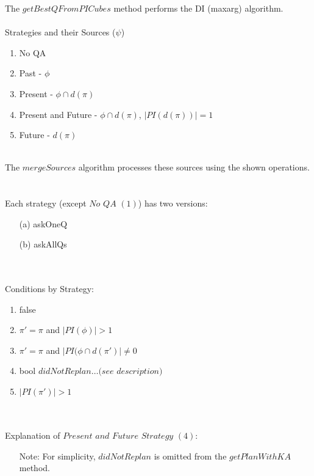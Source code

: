 \documentclass[letterpaper]{article}
\begin{document}
The $getBestQFromPICubes$ method performs the DI (maxarg) algorithm. 
\ \\
\ \\
\noindent Strategies and their Sources ($\psi$)
\begin{enumerate}
  \item No QA
  \item Past               - $\phi$
  \item Present            - $\phi \cap d(\pi)$
  \item Present and Future - $\phi \cap d(\pi)$, $|PI(d(\pi))| = 1$
  \item Future             - $d(\pi)$
\end{enumerate}
\ \\
The $mergeSources$ algorithm processes these sources using the shown operations.
\ \\
\ \\
\noindent Each strategy (except $No$  $QA$ $(1)$) has two versions:
\begin{enumerate}
  \item[(a)] askOneQ
  \item[(b)] askAllQs
\end{enumerate}
\ \\
\ \\
\noindent Conditions by Strategy:
\begin{enumerate}
\item false
\item $\pi' = \pi $  and $ |PI(\phi)| > 1$
\item $\pi' = \pi $ and $ |PI(\phi \cap d(\pi')| \neq 0$
\item bool $didNotReplan \ldots (see$ $description)$
\item $|PI(\pi')| > 1$ 
\end{enumerate}
\ \\
\ \\
\noindent Explanation of $Present$ $and$ $Future$ $Strategy$ $(4)$:\
\begin{itemize}
  \item[] Note: For simplicity, $didNotReplan$ is omitted from
  the $getPlanWithKA$ method.
\end{itemize}
\end{document}

